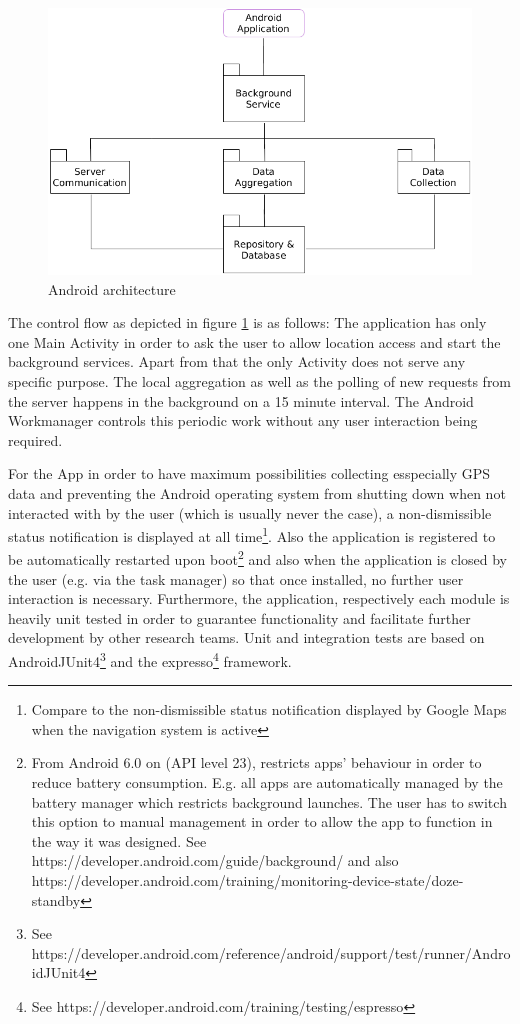 \begin{figure}[h!]
  \caption{Android architecture}
  \label{android-overview}
  \includegraphics[width=\textwidth]{data/diagrams/android-architecture.png}
\end{figure}

The control flow as depicted in figure \ref{android-overview} is as follows: 
The application has only one Main Activity in order to ask the user to allow location access and start the background services. Apart from that the only Activity does not serve any specific purpose. 
The local aggregation as well as the polling of new requests from the server happens in the background on a 15 minute interval. The Android Workmanager controls this periodic work without any user interaction being required.

For the App in order to have maximum possibilities collecting esspecially GPS data and preventing the Android operating system from shutting down when not interacted with by the user (which is usually never the case), a non-dismissible status notification is displayed at all time\footnote{Compare to the non-dismissible status notification displayed by Google Maps when the navigation system is active}. Also the application is registered to be automatically restarted upon boot\footnote{From Android 6.0 on (API level 23), restricts apps' behaviour in order to reduce battery consumption. E.g. all apps are automatically managed by the battery manager which restricts background launches. The user has to switch this option to manual management in order to allow the app to function in the way it was designed. See https://developer.android.com/guide/background/ and also https://developer.android.com/training/monitoring-device-state/doze-standby} and also when the application is closed by the user (e.g. via the task manager) so that once installed, no further user interaction is necessary.
Furthermore, the application, respectively each module is heavily unit tested in order to guarantee functionality and facilitate further development by other research teams. Unit and integration tests are based on AndroidJUnit4\footnote{See https://developer.android.com/reference/android/support/test/runner/AndroidJUnit4} and the expresso\footnote{See https://developer.android.com/training/testing/espresso} framework.


